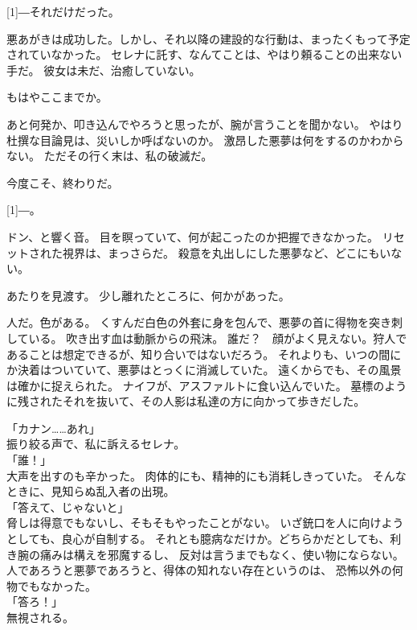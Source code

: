\documentclass[../IHMain]{subfiles}
\begin{document}
\scalebox{3}[1]{―}それだけだった。

悪あがきは成功した。しかし、それ以降の建設的な行動は、まったくもって予定されていなかった。
セレナに託す、なんてことは、やはり頼ることの出来ない手だ。
彼女は未だ、治癒していない。

もはやここまでか。

あと何発か、叩き込んでやろうと思ったが、腕が言うことを聞かない。
やはり杜撰な目論見は、災いしか呼ばないのか。
激昂した悪夢は何をするのかわからない。
ただその行く末は、私の破滅だ。

今度こそ、終わりだ。

\scalebox{6}[1]{―}。

ドン、と響く音。
目を瞑っていて、何が起こったのか把握できなかった。
リセットされた視界は、まっさらだ。
殺意を丸出しにした悪夢など、どこにもいない。

あたりを見渡す。
少し離れたところに、何かがあった。

人だ。色がある。
くすんだ白色の外套に身を包んで、悪夢の首に得物を突き刺している。
吹き出す血は動脈からの飛沫。
誰だ？　顔がよく見えない。狩人であることは想定できるが、知り合いではないだろう。
それよりも、いつの間にか決着はついていて、悪夢はとっくに消滅していた。
遠くからでも、その風景は確かに捉えられた。
ナイフが、アスファルトに食い込んでいた。
墓標のように残されたそれを抜いて、その人影は私達の方に向かって歩きだした。

「カナン……あれ」\\
振り絞る声で、私に訴えるセレナ。\\
「誰！」\\
大声を出すのも辛かった。
肉体的にも、精神的にも消耗しきっていた。
そんなときに、見知らぬ乱入者の出現。\\
「答えて、じゃないと」\\
脅しは得意でもないし、そもそもやったことがない。
いざ銃口を人に向けようとしても、良心が自制する。
それとも臆病なだけか。どちらかだとしても、利き腕の痛みは構えを邪魔するし、
反対は言うまでもなく、使い物にならない。
人であろうと悪夢であろうと、得体の知れない存在というのは、
恐怖以外の何物でもなかった。\\
「答ろ！」\\
無視される。
\end{document}
